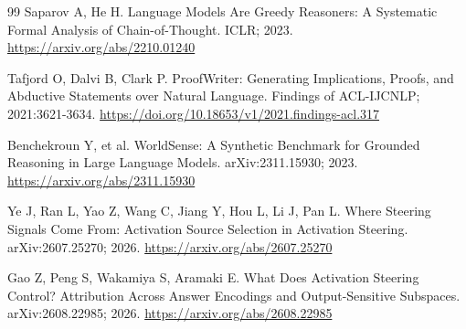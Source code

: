 \documentclass[preprint,12pt,numbers,nopreprintline]{elsarticle}
\begin{document}
\begin{thebibliography}{99}
Saparov A, He H. Language Models Are Greedy Reasoners: A Systematic Formal Analysis of Chain-of-Thought. ICLR; 2023. \url{https://arxiv.org/abs/2210.01240}

Tafjord O, Dalvi B, Clark P. ProofWriter: Generating Implications, Proofs, and Abductive Statements over Natural Language. Findings of ACL-IJCNLP; 2021:3621-3634. \url{https://doi.org/10.18653/v1/2021.findings-acl.317}

Benchekroun Y, et al. WorldSense: A Synthetic Benchmark for Grounded Reasoning in Large Language Models. arXiv:2311.15930; 2023. \url{https://arxiv.org/abs/2311.15930}

Ye J, Ran L, Yao Z, Wang C, Jiang Y, Hou L, Li J, Pan L. Where Steering Signals Come From: Activation Source Selection in Activation Steering. arXiv:2607.25270; 2026. \url{https://arxiv.org/abs/2607.25270}

Gao Z, Peng S, Wakamiya S, Aramaki E. What Does Activation Steering Control? Attribution Across Answer Encodings and Output-Sensitive Subspaces. arXiv:2608.22985; 2026. \url{https://arxiv.org/abs/2608.22985}

\end{thebibliography}
\end{document}
